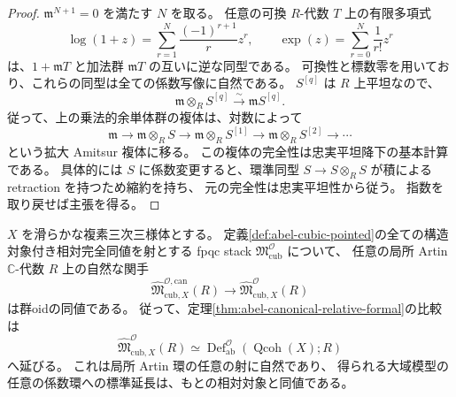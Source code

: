 \begin{proof}
$\mathfrak m^{N+1}=0$ を満たす $N$ を取る。
任意の可換 $R$-代数 $T$ 上の有限多項式
\[
 \log(1+z)=\sum_{r=1}^N\frac{(-1)^{r+1}}r z^r,
 \qquad
 \exp(z)=\sum_{r=0}^N\frac1{r!}z^r
\]
は、$1+\mathfrak mT$ と加法群 $\mathfrak mT$ の互いに逆な同型である。
可換性と標数零を用いており、これらの同型は全ての係数写像に自然である。
$S^{[q]}$ は $R$ 上平坦なので、
\[
 \mathfrak m\otimes_R S^{[q]}\xrightarrow{\sim}
 \mathfrak mS^{[q]}.
\]
従って、上の乗法的余単体群の複体は、対数によって
\[
 \mathfrak m\longrightarrow\mathfrak m\otimes_R S
 \longrightarrow\mathfrak m\otimes_R S^{[1]}
 \longrightarrow\mathfrak m\otimes_R S^{[2]}
 \longrightarrow\cdots
\]
という拡大 Amitsur 複体に移る。
この複体の完全性は忠実平坦降下の基本計算
\cite[Lemma~35.3.6, Tag~023M]{StacksAbel}である。
具体的には $S$ に係数変更すると、環準同型
$S\to S\otimes_R S$ が積による retraction を持つため縮約を持ち、
元の完全性は忠実平坦性から従う。
指数を取り戻せば主張を得る。
\end{proof}

\begin{theorem}
\label{thm:abel-stackified-relative-formal}
$X$ を滑らかな複素三次三様体とする。
定義\ref{def:abel-cubic-pointed}の全ての構造対象付き相対完全同値を射とする
fpqc stack $\mathfrak M^{\mathcal O}_{\mathrm{cub}}$ について、
任意の局所 Artin $\mathbb C$-代数 $R$ 上の自然な関手
\begin{equation}\label{eq:abel-full-stack-formal-equivalence}
 \widehat{\mathfrak M}^{\mathcal O,\mathrm{can}}_{\mathrm{cub},X}(R)
 \longrightarrow
 \widehat{\mathfrak M}^{\mathcal O}_{\mathrm{cub},X}(R)
\end{equation}
は群oidの同値である。
従って、定理\ref{thm:abel-canonical-relative-formal}の比較は
\[
 \widehat{\mathfrak M}^{\mathcal O}_{\mathrm{cub},X}(R)
 \simeq
 \operatorname{Def}^{\mathcal O}_{\mathrm{ab}}
       (\operatorname{Qcoh}(X);R)
\]
へ延びる。
これは局所 Artin 環の任意の射に自然であり、
得られる大域模型の任意の係数環への標準延長は、もとの相対対象と同値である。
\end{theorem}

